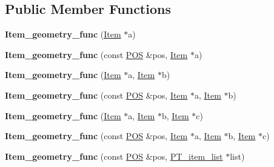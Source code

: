 \subsection*{Public Member Functions}
\begin{DoxyCompactItemize}
\item 
\mbox{\label{classItem__geometry__func_a53fe4a963c6c94d017f6d41bfe739dde}} 
{\bfseries Item\+\_\+geometry\+\_\+func} (\mbox{\hyperlink{classItem}{Item}} $\ast$a)
\item 
\mbox{\label{classItem__geometry__func_a781ffe543ac45daf92c7d33cd8cdc711}} 
{\bfseries Item\+\_\+geometry\+\_\+func} (const \mbox{\hyperlink{structYYLTYPE}{P\+OS}} \&pos, \mbox{\hyperlink{classItem}{Item}} $\ast$a)
\item 
\mbox{\label{classItem__geometry__func_a30db1386883c533e8397bff978f83558}} 
{\bfseries Item\+\_\+geometry\+\_\+func} (\mbox{\hyperlink{classItem}{Item}} $\ast$a, \mbox{\hyperlink{classItem}{Item}} $\ast$b)
\item 
\mbox{\label{classItem__geometry__func_afa3621fdc356a912e01e75220068db97}} 
{\bfseries Item\+\_\+geometry\+\_\+func} (const \mbox{\hyperlink{structYYLTYPE}{P\+OS}} \&pos, \mbox{\hyperlink{classItem}{Item}} $\ast$a, \mbox{\hyperlink{classItem}{Item}} $\ast$b)
\item 
\mbox{\label{classItem__geometry__func_a5f37f48df3a11074a086d33b3c887b5d}} 
{\bfseries Item\+\_\+geometry\+\_\+func} (\mbox{\hyperlink{classItem}{Item}} $\ast$a, \mbox{\hyperlink{classItem}{Item}} $\ast$b, \mbox{\hyperlink{classItem}{Item}} $\ast$c)
\item 
\mbox{\label{classItem__geometry__func_a45132106499d5ede3313bf1fc65464b2}} 
{\bfseries Item\+\_\+geometry\+\_\+func} (const \mbox{\hyperlink{structYYLTYPE}{P\+OS}} \&pos, \mbox{\hyperlink{classItem}{Item}} $\ast$a, \mbox{\hyperlink{classItem}{Item}} $\ast$b, \mbox{\hyperlink{classItem}{Item}} $\ast$c)
\item 
\mbox{\label{classItem__geometry__func_a2c9c93cd6bab13714dde571be96f2456}} 
{\bfseries Item\+\_\+geometry\+\_\+func} (const \mbox{\hyperlink{structYYLTYPE}{P\+OS}} \&pos, \mbox{\hyperlink{classPT__item__list}{P\+T\+\_\+item\+\_\+list}} $\ast$list)

\end{DoxyCompactItemize}
